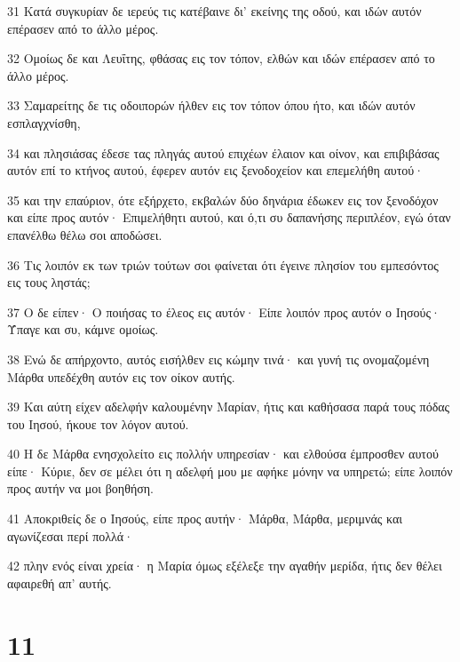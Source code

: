 \par 31 Κατά συγκυρίαν δε ιερεύς τις κατέβαινε δι' εκείνης της οδού, και ιδών αυτόν επέρασεν από το άλλο μέρος.
\par 32 Ομοίως δε και Λευΐτης, φθάσας εις τον τόπον, ελθών και ιδών επέρασεν από το άλλο μέρος.
\par 33 Σαμαρείτης δε τις οδοιπορών ήλθεν εις τον τόπον όπου ήτο, και ιδών αυτόν εσπλαγχνίσθη,
\par 34 και πλησιάσας έδεσε τας πληγάς αυτού επιχέων έλαιον και οίνον, και επιβιβάσας αυτόν επί το κτήνος αυτού, έφερεν αυτόν εις ξενοδοχείον και επεμελήθη αυτού·
\par 35 και την επαύριον, ότε εξήρχετο, εκβαλών δύο δηνάρια έδωκεν εις τον ξενοδόχον και είπε προς αυτόν· Επιμελήθητι αυτού, και ό,τι συ δαπανήσης περιπλέον, εγώ όταν επανέλθω θέλω σοι αποδώσει.
\par 36 Τις λοιπόν εκ των τριών τούτων σοι φαίνεται ότι έγεινε πλησίον του εμπεσόντος εις τους ληστάς;
\par 37 Ο δε είπεν· Ο ποιήσας το έλεος εις αυτόν· Είπε λοιπόν προς αυτόν ο Ιησούς· Ύπαγε και συ, κάμνε ομοίως.
\par 38 Ενώ δε απήρχοντο, αυτός εισήλθεν εις κώμην τινά· και γυνή τις ονομαζομένη Μάρθα υπεδέχθη αυτόν εις τον οίκον αυτής.
\par 39 Και αύτη είχεν αδελφήν καλουμένην Μαρίαν, ήτις και καθήσασα παρά τους πόδας του Ιησού, ήκουε τον λόγον αυτού.
\par 40 Η δε Μάρθα ενησχολείτο εις πολλήν υπηρεσίαν· και ελθούσα έμπροσθεν αυτού είπε· Κύριε, δεν σε μέλει ότι η αδελφή μου με αφήκε μόνην να υπηρετώ; είπε λοιπόν προς αυτήν να μοι βοηθήση.
\par 41 Αποκριθείς δε ο Ιησούς, είπε προς αυτήν· Μάρθα, Μάρθα, μεριμνάς και αγωνίζεσαι περί πολλά·
\par 42 πλην ενός είναι χρεία· η Μαρία όμως εξέλεξε την αγαθήν μερίδα, ήτις δεν θέλει αφαιρεθή απ' αυτής.

\chapter{11}

